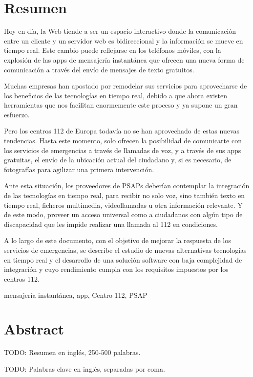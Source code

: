 \chapter*{Resumen}

\begin{abstractEs}
	Hoy en día, la Web tiende a ser un espacio interactivo donde la comunicación entre un cliente y un servidor web es bidireccional y la información se mueve en tiempo real. Este cambio puede reflejarse en los teléfonos móviles, con la explosión de las apps de mensajería instantánea que ofrecen una nueva forma de comunicación a través del envío de mensajes de texto gratuitos.

	Muchas empresas han apostado por remodelar sus servicios para aprovecharse de los beneficios de las tecnologías en tiempo real, debido a que ahora existen herramientas que nos facilitan enormemente este proceso y ya supone un gran esfuerzo.

	Pero los centros 112 de Europa todavía no se han aprovechado de estas nuevas tendencias. Hasta este momento, solo ofrecen la posibilidad de comunicarte con los servicios de emergencias a través de llamadas de voz, y a través de sus apps gratuitas, el envío de la ubicación actual del ciudadano y, si es necesario, de fotografías para agilizar una primera intervención.

	Ante esta situación, los proveedores de PSAPs deberían contemplar la integración de las tecnologías en tiempo real, para recibir no solo voz, sino también texto en tiempo real, ficheros multimedia, videollamadas u otra información relevante. Y de este modo, proveer un acceso universal como a ciudadanos con algún tipo de discapacidad que les impide realizar una llamada al 112 en condiciones.

	A lo largo de este documento, con el objetivo de mejorar la respuesta de los servicios de emergencias, se describe el estudio de nuevas alternativas tecnologías en tiempo real y el desarrollo de una solución software con baja complejidad de integración y cuyo rendimiento cumpla con los requisitos impuestos por los centros 112.

\end{abstractEs}

\begin{keywordsEs}
	mensajería instantánea, app, Centro 112, PSAP
\end{keywordsEs}

\chapter*{Abstract}

\begin{abstractEn}
TODO: Resumen en inglés, 250-500 palabras.

\end{abstractEn}

\begin{keywordsEn}
TODO: Palabras clave en inglés, separadas por coma.
\end{keywordsEn}


